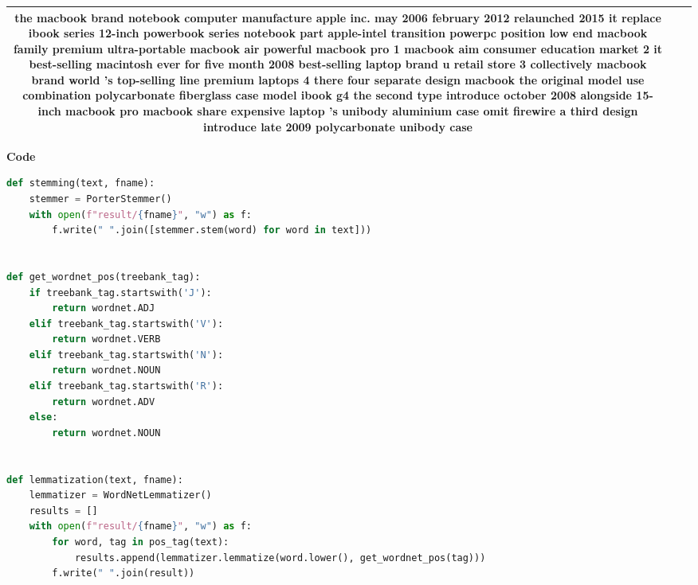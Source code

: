 \begin{homeworkProblem}
\begin{table}[!h]
\begin{tabularx}{\textwidth}{|c|X|X|}
            the macbook brand notebook computer manufacture apple inc. may 2006 february 2012 relaunched 2015 it replace ibook series 12-inch powerbook series notebook part apple-intel transition powerpc position low end macbook family premium ultra-portable macbook air powerful macbook pro 1 macbook aim consumer education market 2 it best-selling macintosh ever for five month 2008 best-selling laptop brand u retail store 3 collectively macbook brand world 's top-selling line premium laptops 4 there four separate design macbook the original model use combination polycarbonate fiberglass case model ibook g4 the second type introduce october 2008 alongside 15-inch macbook pro macbook share expensive laptop 's unibody aluminium case omit firewire a third design introduce late 2009 polycarbonate unibody case \\
            \hline
        \end{tabularx}
    \end{table}

    \pagebreak

    \textbf{\large Code}

    \begin{lstlisting}[language=python]
def stemming(text, fname):
    stemmer = PorterStemmer()
    with open(f"result/{fname}", "w") as f:
        f.write(" ".join([stemmer.stem(word) for word in text]))


def get_wordnet_pos(treebank_tag):
    if treebank_tag.startswith('J'):
        return wordnet.ADJ
    elif treebank_tag.startswith('V'):
        return wordnet.VERB
    elif treebank_tag.startswith('N'):
        return wordnet.NOUN
    elif treebank_tag.startswith('R'):
        return wordnet.ADV
    else:
        return wordnet.NOUN


def lemmatization(text, fname):
    lemmatizer = WordNetLemmatizer()
    results = []
    with open(f"result/{fname}", "w") as f:
        for word, tag in pos_tag(text):
            results.append(lemmatizer.lemmatize(word.lower(), get_wordnet_pos(tag)))
        f.write(" ".join(result))
    \end{lstlisting}

\end{homeworkProblem}

\pagebreak
